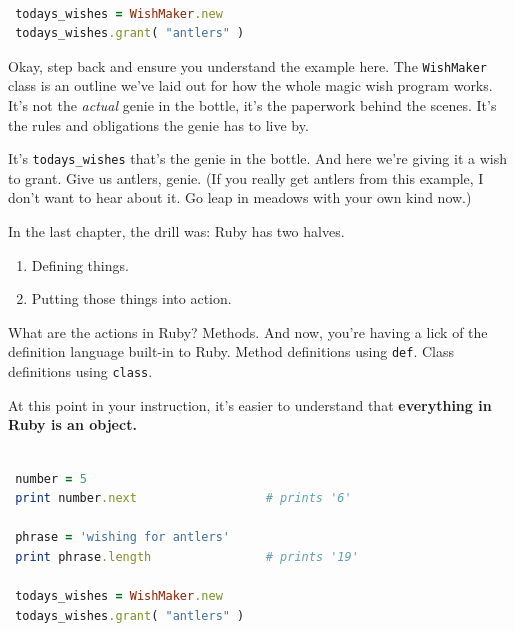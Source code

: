 \documentclass[10pt,twoside]{report}
\begin{document}
\begin{lstlisting}[basicstyle=\ttfamily\color{basiccolor},
    commentstyle = \ttfamily\color{commentcolor},
    keywordstyle=\ttfamily\color{keywordscolor},
    stringstyle=\color{stringcolor},
    language=Ruby,
    basicstyle=\small\ttfamily,
    showstringspaces=false,
  ]

 todays_wishes = WishMaker.new 
 todays_wishes.grant( "antlers" )

\end{lstlisting}


Okay, step back and ensure you understand the example here.  The
\lstinline[breaklines=true]|WishMaker| class is an outline we've laid
out for how the whole magic wish program works.  It's not the {\em
  actual} genie in the bottle, it's the paperwork behind the scenes.
It's the rules and obligations the genie has to live by.

It's \lstinline[breaklines=true]|todays_wishes| that's the genie in
the bottle.  And here we're giving it a wish to grant. Give us
antlers, genie.  (If you really get antlers from this example, I don't
want to hear about it.  Go leap in meadows with your own kind now.)

In the last chapter, the drill was: Ruby has two halves.

\begin{enumerate}
\item Defining things.
\item Putting those things into action.
\end{enumerate}

What are the actions in Ruby?  Methods.  And now, you're having a lick
of the definition language built-in to Ruby.  Method definitions using
\lstinline[breaklines=true]|def|.  Class definitions using
\lstinline[breaklines=true]|class|.

At this point in your instruction, it's easier to understand that {\bf
  everything in Ruby is an object.}


\begin{lstlisting}[basicstyle=\ttfamily\color{basiccolor},
    commentstyle = \ttfamily\color{commentcolor},
    keywordstyle=\ttfamily\color{keywordscolor},
    stringstyle=\color{stringcolor},
    language=Ruby,
    basicstyle=\small\ttfamily,
    showstringspaces=false,
  ]

 number = 5
 print number.next                  # prints '6'

 phrase = 'wishing for antlers'
 print phrase.length                # prints '19'

 todays_wishes = WishMaker.new
 todays_wishes.grant( "antlers" )

\end{lstlisting}
\end{document}
